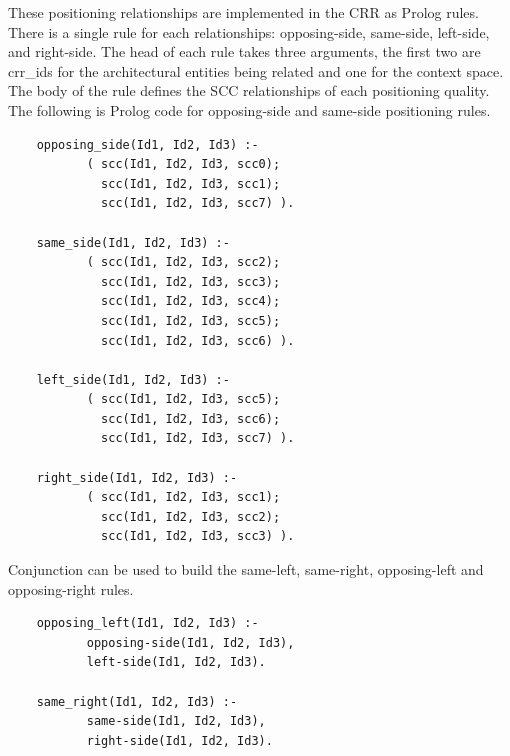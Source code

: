 \documentclass[12pt]{ucthesis}
\begin{document}
These positioning relationships are implemented in the CRR as Prolog rules. There is a single rule for each relationships: opposing-side, same-side, left-side, and right-side. The head of each rule takes three arguments, the first two are crr\_ids for the architectural entities being related and one for the context space. The body of the rule defines the SCC relationships of each positioning quality. The following is Prolog code for opposing-side and same-side positioning rules.
\begin{verbatim}
    opposing_side(Id1, Id2, Id3) :- 
           ( scc(Id1, Id2, Id3, scc0);
             scc(Id1, Id2, Id3, scc1);
             scc(Id1, Id2, Id3, scc7) ).
                                          
    same_side(Id1, Id2, Id3) :- 
           ( scc(Id1, Id2, Id3, scc2);
             scc(Id1, Id2, Id3, scc3);
             scc(Id1, Id2, Id3, scc4);
             scc(Id1, Id2, Id3, scc5);
             scc(Id1, Id2, Id3, scc6) ).
             
    left_side(Id1, Id2, Id3) :- 
           ( scc(Id1, Id2, Id3, scc5);
             scc(Id1, Id2, Id3, scc6);
             scc(Id1, Id2, Id3, scc7) ).
             
    right_side(Id1, Id2, Id3) :- 
           ( scc(Id1, Id2, Id3, scc1);
             scc(Id1, Id2, Id3, scc2);
             scc(Id1, Id2, Id3, scc3) ).                    
\end{verbatim} Conjunction can be used to build the same-left, same-right, opposing-left and opposing-right rules. 
\begin{verbatim}
    opposing_left(Id1, Id2, Id3) :- 
           opposing-side(Id1, Id2, Id3),
           left-side(Id1, Id2, Id3).

    same_right(Id1, Id2, Id3) :- 
           same-side(Id1, Id2, Id3),
           right-side(Id1, Id2, Id3).                                         
\end{verbatim}
\end{document}
